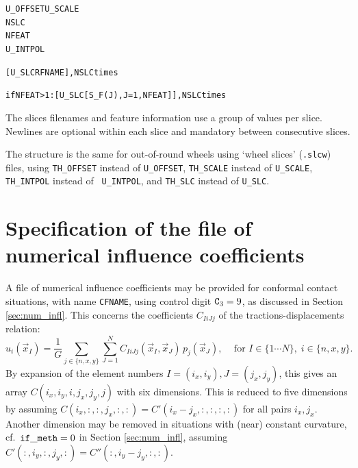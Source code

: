 \documentclass[12pt]{report}
\renewcommand{\magenta}[1]{}
\begin{document}
\begin{alltt}\small

U_OFFSET   U_SCALE
NSLC
NFEAT     \magenta{\{NKINK\}      \{NACCEL\}}
U_INTPOL  \magenta{\{PERTURB\}}


[ U_SLC     RFNAME ],  NSLC times


\magenta{if NKINK >0:  [ P_KINK(J),  J=1,NKINK    ]
if NACCEL>0:  [ P_ACCEL(J), J=1,NACCEL   ]
}if NFEAT >1:  [ U_SLC  [ S_F(J), J=1,NFEAT ] ],  NSLC times\magenta{

if PERTURB=1:   NTERM
              [ AMPL     WAVEL      UPHASE   ],  NTERM times
if PERTURB=2:   NTERM
              [ AMPL     NORDER     TPHASE   ],  NTERM times}
\end{alltt}
\magenta{Keywords for kinks and accelerations are introduced for a future
extension. The positions of kinks and accelerations are entered each as one
`group of values'. They may be presented on a single line of input or may
be separated by newlines as discussed in Section \ref{sec:inputfile}.}

The slices filenames and feature information use a group of values
per slice. Newlines are optional within each slice and mandatory between
consecutive slices. 

The structure is the same for out-of-round wheels using `wheel slices'
({\tt .slcw}) files, using {\tt TH\_\-OFF\-SET} instead of {\tt U\_OFFSET},
{\tt TH\_SCALE} instead of {\tt U\_SCALE}, {\tt TH\_INTPOL} instead of {\tt
U\_INTPOL}, and {\tt TH\_SLC} instead of {\tt U\_SLC}.

\section{Specification of the file of numerical influence coefficients}
\label{sec:spec_inflcf}

A file of numerical influence coefficients may be provided for conformal
contact situations, with name {\tt CFNAME}, using control digit
${\tt C}_3=9$, as discussed in Section \ref{sec:num_infl}. This concerns
the coefficients $C_{IiJj}$ of the tractions-displacements relation:
\begin{equation}\label{eq:ui_sum_Cij_pj}
    u_i(\vec{x}_I) = \frac{1}{G} \sum_{j\in\{n,x,y\}}\sum_{J=1}^N
        C_{IiJj}(\vec{x}_I,\vec{x}_J) \, p_j(\vec{x}_J), \;\;\;
        \mbox{ for } I\in\{1\cdots N\}, \; i\in \{n,x,y\}.
\end{equation}
By expansion of the element numbers $I=(i_x,i_y), J=(j_x,j_y)$, this gives
an array $C(i_x,i_y,i,j_x,j_y,j)$ with six dimensions. This is reduced to five
dimensions by assuming $C(i_x,:,:,j_x,:,:)=C'(i_x-j_x,:,:,:,:)$ for all
pairs $i_x,j_x$. Another dimension may be removed in situations with
(near) constant curvature, cf.\ ${\tt if\_meth}=0$ in Section
\ref{sec:num_infl}, assuming $C'(:,i_y,:,j_y,:)=C''(:,i_y-j_y,:,:)$.
\end{document}
